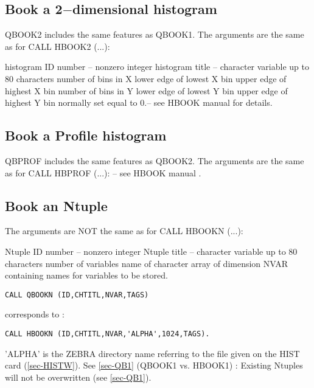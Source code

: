 \subsection{\label{sec-QB2}Book a 2$-$dimensional histogram}
\par
{}
\par
\par
QBOOK2 includes the same features as QBOOK1.
The arguments are the same as for CALL HBOOK2 (...):
\begin{indentlist}{ 2.50cm}{ 2.75cm}
histogram ID number -- nonzero integer
histogram title -- character variable up to 80 characters
number of bins in X
lower edge of lowest X bin
upper edge of highest X bin
number of bins in Y
lower edge of lowest Y bin
upper edge of highest Y bin
normally set equal to 0.-- see HBOOK manual for details.
\end{indentlist}
 
 
\subsection{\label{sec-QBP}Book a Profile histogram}
\par
{}
\par
\par
QBPROF includes the same features as QBOOK2.
The arguments are the same as for CALL HBPROF (...): -- see HBOOK manual .
 
\subsection{\label{sec-QBN}Book an Ntuple}
\par
{}
\par
\par The arguments are NOT the same as for CALL HBOOKN (...):
\begin{indentlist}{ 2.50cm}{ 2.75cm}
Ntuple ID number -- nonzero integer
Ntuple title -- character variable up to 80 characters
number of variables
name of character array of dimension NVAR containing
names for variables to be stored.
\end{indentlist}
\par
\begin{verbatim}
CALL QBOOKN (ID,CHTITL,NVAR,TAGS)
\end{verbatim}
corresponds to :
\begin{verbatim}
CALL HBOOKN (ID,CHTITL,NVAR,'ALPHA',1024,TAGS).
\end{verbatim}
'ALPHA' is the ZEBRA directory name referring to the file
given on the HIST card (\ref{sec-HISTW}).
See \ref{sec-QB1} (QBOOK1 vs. HBOOK1) :
Existing Ntuples will not be
overwritten (see \ref{sec-QB1}).
 
